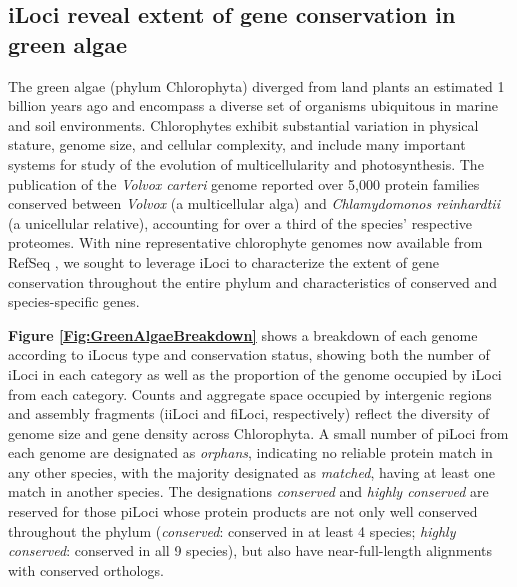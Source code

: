 \subsection{iLoci reveal extent of gene conservation in green algae}
The green algae (phylum Chlorophyta) diverged from land plants an estimated 1 billion years ago \cite{Merchant245} and encompass a diverse set of organisms ubiquitous in marine and soil environments.
Chlorophytes exhibit substantial variation in physical stature, genome size, and cellular complexity, and include many important systems for study of the evolution of multicellularity and photosynthesis.
The publication of the \textit{Volvox carteri} genome \cite{VolvoxGenome} reported over 5,000 protein families conserved between \textit{Volvox} (a multicellular alga) and \textit{Chlamydomonos reinhardtii} (a unicellular relative), accounting for over a third of the  species' respective proteomes.
With nine representative chlorophyte genomes now available from RefSeq \cite{RefSeq}, we sought to leverage iLoci to characterize the extent of gene conservation throughout the entire phylum and characteristics of conserved and species-specific genes.

\textbf{Figure \ref{Fig:GreenAlgaeBreakdown}} shows a breakdown of each genome according to iLocus type and conservation status, showing both the number of iLoci in each category as well as the proportion of the genome occupied by iLoci from each category.
Counts and aggregate space occupied by intergenic regions and assembly fragments (iiLoci and fiLoci, respectively) reflect the diversity of genome size and gene density across Chlorophyta.
A small number of piLoci from each genome are designated as \textit{orphans}, indicating no reliable protein match in any other species, with the majority designated as \textit{matched}, having at least one match in another species.
The designations \textit{conserved} and \textit{highly conserved} are reserved for those piLoci whose protein products are not only well conserved throughout the phylum (\textit{conserved}: conserved in at least 4 species; \textit{highly conserved}: conserved in all 9 species), but also have near-full-length alignments with conserved orthologs.

